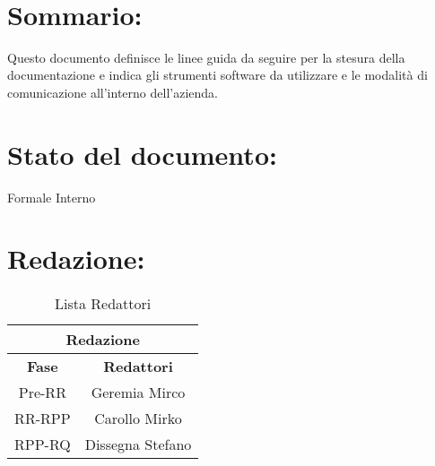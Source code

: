 \newpage
 
\begin{center} %
  \begin{Huge}  
        \textbf{\TITOLODOC}
      \\
  \end{Huge}
\end{center}
 
\section*{\LARGE Sommario:} %
\indent \indent
Questo documento definisce le linee guida da seguire per la stesura della documentazione e indica gli strumenti software da utilizzare e le modalit\`a di comunicazione all'interno dell'azienda.
 
\section*{\LARGE Stato del documento:}
\indent \indent
  Formale Interno
 
\section*{\LARGE Redazione:}
  \begin{table}[!h]
    \begin{center}
      \begin{tabular}
        {|c|c|}
        \hline
        \multicolumn{2}{|c|}{ \textbf{Redazione} } \\
        \hline
        \textbf{Fase} & \textbf{Redattori} \\
        \hline
        {Pre-RR} & Geremia Mirco \\
        \hline
        {RR-RPP} & Carollo Mirko \\
        \hline
        {RPP-RQ} & Dissegna Stefano\\
        \hline
      \end{tabular}
      \caption{Lista Redattori} %
      \label{tabredazione}
    \end{center}
  \end{table}
  
